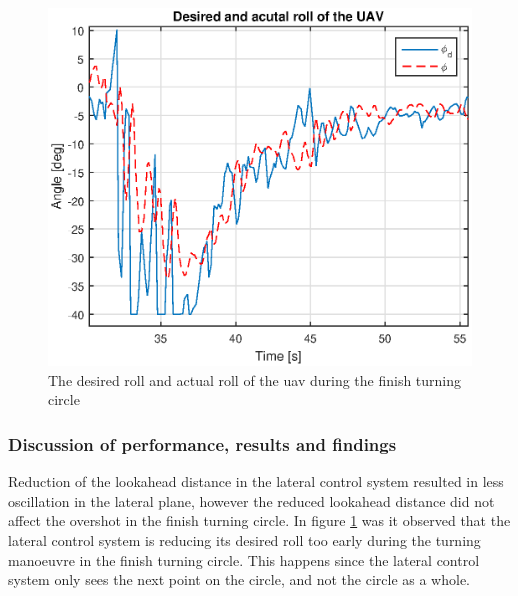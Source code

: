 \begin{figure}[H]
\centering
\includegraphics[scale=0.7]{figs/Experiment/rollDesired131844.eps}
\caption{The desired roll and actual roll of the \gls{uav} during the finish turning circle}
\label{Fig:DesiredRoll131844}
\end{figure}
\subsubsection{Discussion of performance, results and findings}
Reduction of the lookahead distance in the lateral control system resulted in less oscillation in the lateral plane, however the reduced lookahead distance did not affect the overshot in the finish turning circle. In figure \ref{Fig:DesiredRoll131844} was it observed that the lateral control system is reducing its desired roll too early during the turning manoeuvre in the finish turning circle. This happens since the lateral control system only sees the next point on the circle, and not the circle as a whole.

